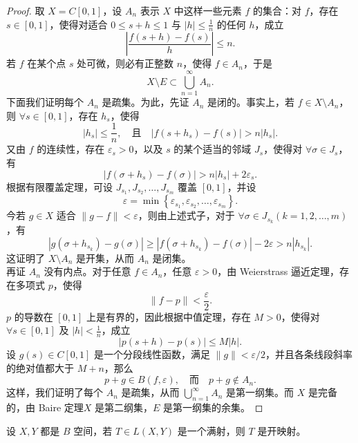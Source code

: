 \documentclass[lang=cn,newtx,10pt,scheme=chinese,thmcnt=chapter]{elegantbook}
\begin{document}
\begin{proof}
	取 ${X} = C[0,1]$，设 $A_n$ 表示 ${X}$ 中这样一些元素 $f$ 的集合：对 $f$，存在 $s \in [0,1]$，使得对适合 $0 \leqslant s + h \leqslant 1$ 与 $|h| \leqslant \frac{1}{n}$ 的任何 $h$，成立
	\[
	\left|\frac{f(s+h) - f(s)}{h}\right| \leqslant n.
	\]
	若 $f$ 在某个点 $s$ 处可微，则必有正整数 $n$，使得 $f \in A_n$，于是
	\[
	{X} \setminus E \subset \bigcup_{n=1}^{\infty} A_n.
	\]
	下面我们证明每个 $A_n$ 是疏集。为此，先证 $A_n$ 是闭的。事实上，若 $f \in {X} \setminus A_n$，则 $\forall s \in [0,1]$，存在 $h_s$，使得
	\[
	\left|h_s\right| \leqslant \frac{1}{n}, \quad \text{且}\quad \left|f(s+h_s) - f(s)\right| > n |h_s|.
	\]
	又由 $f$ 的连续性，存在 $\varepsilon_s > 0$，以及 $s$ 的某个适当的邻域 $J_s$，使得对 $\forall \sigma \in J_s$，有
	\[
	\left|f(\sigma+h_s) - f(\sigma)\right| > n |h_s| + 2 \varepsilon_s.
	\]
	根据有限覆盖定理，可设 $J_{s_1}, J_{s_2}, \dots, J_{s_m}$ 覆盖 $[0,1]$，并设
	\[
	\varepsilon = \min \left\{ \varepsilon_{s_1}, \varepsilon_{s_2}, \dots, \varepsilon_{s_m} \right\}.
	\]
	今若 $g \in {X}$ 适合 $\|g - f\| < \varepsilon$，则由上述式子，对于 $\forall \sigma \in J_{s_k}(k = 1, 2, \dots, m)$，有
	\[
	\left|g(\sigma + h_{s_k}) - g(\sigma)\right| \geqslant \left|f(\sigma + h_{s_k}) - f(\sigma)\right| - 2 \varepsilon > n |h_{s_k}|.
	\]
	这证明了 ${X} \setminus A_n$ 是开集，从而 $A_n$ 是闭集。\\
	再证 $A_n$ 没有内点。对于任意 $f \in A_n$，任意 $\varepsilon > 0$，由 Weierstrass 逼近定理，存在多项式 $p$，使得
	\[
	\|f - p\| < \frac{\varepsilon}{2}.
	\]
	$p$ 的导数在 $[0,1]$ 上是有界的，因此根据中值定理，存在 $M > 0$，使得对 $\forall s \in [0,1]$ 及 $|h| < \frac{1}{n}$，成立
	\[
	|p(s+h) - p(s)| \leqslant M |h|.
	\]
	设 $g(s) \in C[0,1]$ 是一个分段线性函数，满足 $\|g\| < \varepsilon / 2$，并且各条线段斜率的绝对值都大于 $M+n$，那么
	\[
	p + g \in B(f, \varepsilon), \quad \text{而} \quad p + g \notin A_n.
	\]
	这样，我们证明了每个 $A_n$ 是疏集，从而 $\bigcup_{n=1}^{\infty} A_n$ 是第一纲集。而 ${X}$ 是完备的，由 Baire 定理${X}$ 是第二纲集，$E$ 是第一纲集的余集。
\end{proof}

\begin{theorem}[开映射定理]
	设 $X, Y$ 都是 $B$ 空间，若 $T \in {L}({X}, {Y})$ 是一个满射，则 $T$ 是开映射。
\end{theorem}
\end{document}
